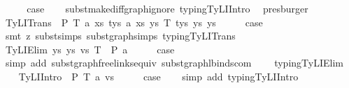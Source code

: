\begin{isabellebody}
\ \ \isamarkupfalse%
\ \isamarkupfalse%
\ {\isacharquery}{\kern0pt}case\isanewline
\ \ \isamarkupfalse%
\ subst{\isacharunderscore}{\kern0pt}make{\isacharunderscore}{\kern0pt}diffgraph{\isacharunderscore}{\kern0pt}ignore\ typing{\isachardot}{\kern0pt}TyLIIntro\ \isamarkupfalse%
\ presburger\isanewline
{}\isamarkupfalse%
\isanewline
\ \ \isamarkupfalse%
\ {\isacharparenleft}{\kern0pt}TyLITrans\ {\isasymGamma}\ P\ T{}\ a{}\ xs{}\ tys{}\ a{}\ xs{}\ ys{}\ T{}\ tys{}\ ys{}\ ys{\isacharparenright}{\kern0pt}\isanewline
\ \ \isamarkupfalse%
\ \isamarkupfalse%
\ {\isacharquery}{\kern0pt}case\isanewline
\ \ \isamarkupfalse%
\ {\isacharparenleft}{\kern0pt}smt\ {\isacharparenleft}{\kern0pt}z{}{\isacharparenright}{\kern0pt}\ subst{\isachardot}{\kern0pt}simps{\isacharparenleft}{\kern0pt}{}{\isacharparenright}{\kern0pt}\ subst{\isacharunderscore}{\kern0pt}graph{\isachardot}{\kern0pt}simps{\isacharparenleft}{\kern0pt}{}{\isacharparenright}{\kern0pt}\ typing{\isachardot}{\kern0pt}TyLITrans{\isacharparenright}{\kern0pt}\isanewline
{}\isamarkupfalse%
\isanewline
\ \ \isamarkupfalse%
\ {\isacharparenleft}{\kern0pt}TyLIElim{}\ ys\ ys{\isacharprime}{\kern0pt}\ vs\ T\ {\isasymGamma}\ P\ a{\isacharparenright}{\kern0pt}\isanewline
\ \ \isamarkupfalse%
\ \isamarkupfalse%
\ {\isacharquery}{\kern0pt}case\isanewline
\ \ \isamarkupfalse%
\ {\isacharparenleft}{\kern0pt}simp\ add{\isacharcolon}{\kern0pt}\ subst{\isacharunderscore}{\kern0pt}graph{\isacharunderscore}{\kern0pt}freelinks{\isacharunderscore}{\kern0pt}equiv\ subst{\isacharunderscore}{\kern0pt}graph{\isacharunderscore}{\kern0pt}lbinds{\isacharunderscore}{\kern0pt}com\isanewline
\ \ \ \ typing{\isachardot}{\kern0pt}TyLIElim{}{\isacharparenright}{\kern0pt}\isanewline
{}\isamarkupfalse%
\isanewline
\ \ \isamarkupfalse%
\ {\isacharparenleft}{\kern0pt}TyLIIntro{}\ {\isasymGamma}\ P\ T\ a\ vs{\isacharparenright}{\kern0pt}\isanewline
\ \ \isamarkupfalse%
\ \isamarkupfalse%
\ {\isacharquery}{\kern0pt}case\isanewline
\ \ \isamarkupfalse%
\ {\isacharparenleft}{\kern0pt}simp\ add{\isacharcolon}{\kern0pt}\ typing{\isachardot}{\kern0pt}TyLIIntro{}{\isacharparenright}{\kern0pt}\isanewline

\end{isabellebody}

